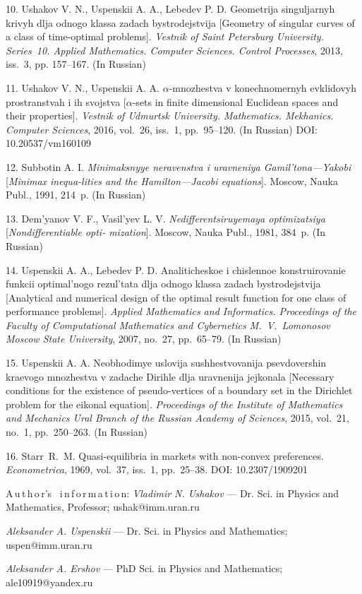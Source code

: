 {10. Ushakov V. N., Uspenskii A. A., Lebedev P. D. Geometrija
singuljarnyh krivyh dlja odnogo klassa zadach bystrodejstvija
[Geometry of singular curves of a class of time-optimal problems].
\textit{Vestnik of Saint Petersburg University. Series~10. Applied
Mathematics. Computer Sciences. Control Processes}, 2013, iss.~3,
pp. 157--167. (In Russian)

11. Ushakov V. N., Uspenskii A. A. $\alpha$-mnozhestva v
konechnomernyh evklidovyh prost\-ranst\-vah i ih svojstva
[$\alpha$-sets in finite dimensional Euclidean spaces and their
properties]. \textit{Vestnik of Udmurtsk University. Mathematics.
Mekhanics. Computer Sciences}, 2016,  vol.~26, iss.~1,
pp.~95--120. (In Russian) DOI: 10.20537/vm160109

12. Subbotin A. I. {\it Minimaksnyye neravenstva i uravneniya
Gamil'tona---Yakobi} [{\it Minimax inequa-\linebreak lities and
the Hamilton---Jacobi equations}]. Moscow, Nauka Publ., 1991,
214~p. (In Russian)

13. Dem'yanov V. F., Vasil'yev L. V. {\it Nedifferentsiruyemaya
optimizatsiya} [{\it Non\-dif\-fe\-ren\-ti\-ab\-le opti-\linebreak
mization}]. Moscow, Nauka Publ., 1981, 384~p. (In Russian)

14. Uspenskii A. A., Lebedev P. D. Analiticheskoe i chislennoe
konstruirovanie funkcii optimal'nogo rezul'tata dlja odnogo klassa
zadach bystrodejstvija [Analytical and numerical design of the
optimal result function for one class of performance problems].
\textit{Applied Ma\-the\-ma\-tics and Informatics. Proceedings of
the Faculty of Computational Mathematics and Cybernetics
M.~V.~Lomonosov Moscow State University}, 2007, no.~27,
pp.~65--79. (In Russian)

15. Uspenskii A. A. Neobhodimye uslovija sushhestvovanija
psevdovershin kraevogo mno\-zhest\-va v zadache Dirihle dlja
uravnenija jejkonala [Necessary conditions for the existence of
pseudo-vertices of a boundary set in the Dirichlet problem for the
eikonal equation]. \textit{Proceedings of the Institute of
Mathe\-ma\-tics and Mechanics Ural Branch of the Russian Academy
of Sciences}, 2015, vol.~21, no.~1, pp.~250--263. (In Russian)

16. Starr~R.~M. Quasi-equilibria in markets with non-convex
preferences. \textit{Econometrica}, 1969,  vol.~37, iss.~1,
pp.~25--38. DOI: 10.2307/1909201



\vskip6mm A\,u\,t\,h\,o\,r's \ i\,n\,f\,o\,r\,m\,a\,t\,i\,o\,n:
\vskip1.5mm \textit{Vladimir N. Ushakov} --- Dr. Sci. in Physics
and Mathematics, Professor; ushak@imm.uran.ru

\vskip2mm \textit{Aleksander A. Uspenskii} --- Dr. Sci. in Physics
and Mathematics; uspen@imm.uran.ru

\vskip2mm \textit{Aleksander A. Ershov} --- PhD Sci. in Physics
and Mathematics; ale10919@yandex.ru



}
